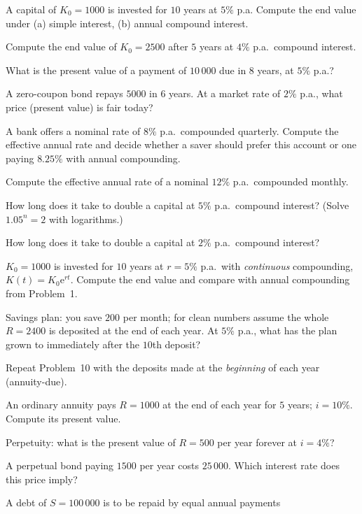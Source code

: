 \begin{problems}
  \item A capital of $K_{0}=1000$ is invested for $10$ years at $5\%$
        p.a. Compute the end value under (a) simple interest,
        (b) annual compound interest.
  \item Compute the end value of $K_{0}=2500$ after $5$ years at $4\%$
        p.a.\ compound interest.
  \item What is the present value of a payment of $10\,000$ due in
        $8$ years, at $5\%$ p.a.?
  \item A zero-coupon bond repays $5000$ in $6$ years. At a market rate
        of $2\%$ p.a., what price (present value) is fair today?
  \item A bank offers a nominal rate of $8\%$ p.a.\ compounded
        quarterly. Compute the effective annual rate and decide whether
        a saver should prefer this account or one paying $8.25\%$ with
        annual compounding.
  \item Compute the effective annual rate of a nominal $12\%$ p.a.\
        compounded monthly.
  \item How long does it take to double a capital at $5\%$ p.a.\
        compound interest? (Solve $1.05^{n}=2$ with logarithms.)
  \item How long does it take to double a capital at $2\%$ p.a.\
        compound interest?
  \item $K_{0}=1000$ is invested for $10$ years at $r=5\%$ p.a.\ with
        \emph{continuous} compounding, $K(t)=K_{0}\mathrm{e}^{rt}$.
        Compute the end value and compare with annual compounding from
        Problem~1.
  \item Savings plan: you save $200$ per month; for clean numbers assume
        the whole $R=2400$ is deposited at the end of each year. At
        $5\%$ p.a., what has the plan grown to immediately after the
        $10$th deposit?
  \item Repeat Problem~10 with the deposits made at the
        \emph{beginning} of each year (annuity-due).
  \item An ordinary annuity pays $R=1000$ at the end of each year for
        $5$ years; $i=10\%$. Compute its present value.
  \item Perpetuity: what is the present value of $R=500$ per year
        forever at $i=4\%$?
  \item A perpetual bond paying $1500$ per year costs $25\,000$. Which
        interest rate does this price imply?
  \item A debt of $S=100\,000$ is to be repaid by equal annual payments

\end{problems}
